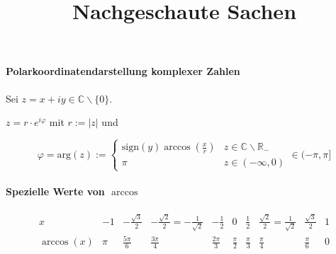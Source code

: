 \documentclass[a4paper, 10pt, DIV20, headings=small]{scrartcl}
\title{Nachgeschaute Sachen}
\theoremstyle{definition}
\theoremstyle{plain}
\begin{document}


\vspace{0.5cm}



\paragraph{Polarkoordinatendarstellung komplexer Zahlen}
Sei $z = x+iy \in \mathbb{C} \backslash \{0\}$.
\begin{center}
$z = r \cdot e^{i \varphi}$ mit $r:= |z|$ und
\end{center}
$$\varphi = \text{arg}(z) := \begin{cases} \text{sign}(y) \arccos(\frac{x}{r}) & z \in \mathbb{C} \backslash \mathbb{R}_- \\ \pi & z \in (- \infty, 0) \end{cases} \in (- \pi, \pi]$$

\paragraph{Spezielle Werte von $\arccos$}
\[
\begin{array}{c||c|c|c|c|c|c|c|c|c}
x & -1 & -\frac{\sqrt{3}}{2} & - \frac{\sqrt{2}}{2} = - \frac{1}{\sqrt{2}} & - \frac{1}{2} & 0 & \frac{1}{2} & \frac{\sqrt{2}}{2} = \frac{1}{\sqrt{2}} & \frac{\sqrt{3}}{2} & 1 \\
\hline 
\arccos(x) & \pi & \frac{5 \pi}{6} & \frac{3 \pi}{4} & \frac{2 \pi}{3} & \frac{\pi}{2} & \frac{\pi}{3} & \frac{\pi}{4} & \frac{\pi}{6} & 0 \\
\end{array}
\]
\end{document}
